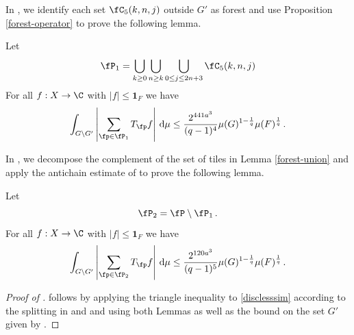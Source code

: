 In , we identify each set $\fC_5(k,n,j)$ outside $G'$ as forest and use Proposition
\ref{forest-operator} to prove the following lemma.

\begin{lemma}
    \label{forest-union}
    \leanok
    Let
    \begin{equation}
        \fP_1 =\bigcup_{k\ge 0}\bigcup_{n\ge k}
        \bigcup_{0\le j\le 2n+3}\fC_5(k,n,j)
    \end{equation}
    For all $f:X\to \C$ with $|f|\le \mathbf{1}_F$ we have
    \begin{equation}
        \label{disclesssim1}
        \int_{G \setminus G'} \left|\sum_{\fp \in \fP_1} T_{\fp} f \right|\, \mathrm{d}\mu \le \frac{2^{441a^3}}{(q-1)^4} \mu(G)^{1 - \frac{1}{q}} \mu(F)^{\frac{1}{q}}\,.
    \end{equation}
\end{lemma}

In , we decompose
the complement of the set of tiles in Lemma
\ref{forest-union} and apply the antichain estimate of
 to prove the following lemma.

\begin{lemma}
    \label{forest-complement}
    \leanok
    Let
    \begin{equation}
        \fP_2 =\fP\setminus \fP_1\,.
    \end{equation}
    For all $f:X\to \C$ with $|f|\le \mathbf{1}_F$ we have
    \begin{equation}
        \label{disclesssim2}
        \int_{G \setminus G'} \left|\sum_{\fp \in \fP_2} T_{\fp} f\right| \, \mathrm{d}\mu \le \frac{2^{120a^3}}{(q-1)^5} \mu(G)^{1 - \frac{1}{q}} \mu(F)^{\frac{1}{q}}\,.
    \end{equation}
\end{lemma}

\begin{proof}[Proof of ]
\leanok
{}
 follows by applying the
triangle inequality to \eqref{disclesssim}
according to the splitting in 
and  and using both Lemmas as well
as the bound on the set $G'$ given by .
\end{proof}

